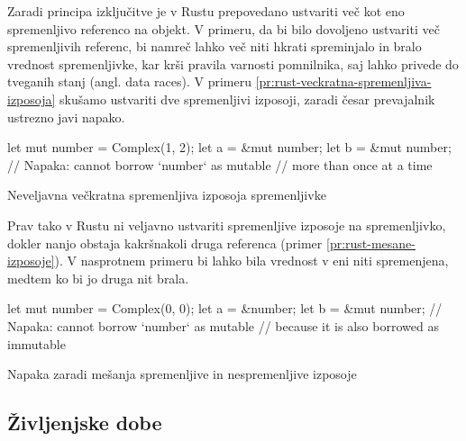 Zaradi principa izključitve je v Rustu prepovedano ustvariti več kot eno spremenljivo referenco na objekt. V primeru, da bi bilo dovoljeno ustvariti več spremenljivih referenc, bi namreč lahko več niti hkrati spreminjalo in bralo vrednost spremenljivke, kar krši pravila varnosti pomnilnika, saj lahko privede do tveganih stanj (angl. data races). V primeru \ref{pr:rust-veckratna-spremenljiva-izposoja} skušamo ustvariti dve spremenljivi izposoji, zaradi česar prevajalnik ustrezno javi napako.

\begin{primer}[ht]
\centering
\begin{rust-failure}
let mut number = Complex(1, 2);
let a = &mut number;
let b = &mut number;  // Napaka: cannot borrow `number` as mutable
                      // more than once at a time
\end{rust-failure}
\caption{Neveljavna večkratna spremenljiva izposoja spremenljivke}
\label{pr:rust-veckratna-spremenljiva-izposoja}
\end{primer}

Prav tako v Rustu ni veljavno ustvariti spremenljive izposoje na spremenljivko, dokler nanjo obstaja kakršnakoli druga referenca (primer \ref{pr:rust-mesane-izposoje}). V nasprotnem primeru bi lahko bila vrednost v eni niti spremenjena, medtem ko bi jo druga nit brala.

\begin{primer}[ht]
\centering
\begin{rust-failure}
let mut number = Complex(0, 0);
let a = &number;
let b = &mut number;  // Napaka: cannot borrow `number` as mutable
                      // because it is also borrowed as immutable
\end{rust-failure}
\caption{Napaka zaradi mešanja spremenljive in nespremenljive izposoje}
\label{pr:rust-mesane-izposoje}
\end{primer}

%

\subsection{Življenjske dobe}

